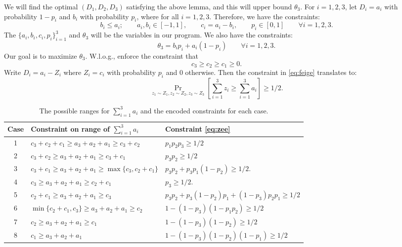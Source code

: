 We will find the optimal $(D_1,D_2, D_3)$ satisfying the above lemma, and this will upper bound $\theta_3$. For $i = 1,2,3$, let $D_i = a_i$ with probability $1-p_i$ and $b_i$ with probability $p_i$, where for all $i = 1,2,3$. Therefore, we have the constraints:
\begin{equation}
\label{eq:3.1}
    b_i \le a_i; \qquad a_i, b_i \in [-1,1],  \qquad  c_i = a_i - b_i, \qquad p_i \in [0,1] \qquad \forall i = 1,2,3. 
\end{equation} 
The $\{a_i,b_i,c_i,p_i\}_{i=1}^3$ and $\theta_3$ will be the variables in our program. We also have the constraints:
\begin{equation} 
\label{eq:3.2}
\theta_3 = b_i p_i + a_i (1-p_i) \qquad \forall i = 1,2,3. 
\end{equation}
Our goal is to maximize $\theta_3$. W.l.o.g., enforce the constraint that 
\begin{equation}
\label{eq:3.3}
c_3 \ge c_2 \ge c_1 \ge 0.
\end{equation}
Write $D_i = a_i - Z_i$ where $Z_i = c_i$ with probability $p_i$ and $0$ otherwise. Then the constraint in \cref{eq:feige} translates to:
\begin{equation}
\label{eq:zee}
\Pr_{z_1  \sim Z_1, z_2 \sim Z_2, z_3 \sim Z_3} \left[ \sum_{i=1}^3 z_i\ge \sum_{i=1}^3 a_i \right] \ge 1/2. 
\end{equation}

\begin{table*}[htbp]
\centering
{}
\begin{tabular}{|c|l|l|}
\hline 
Case &  Constraint on range of $\sum_{i=1}^3 a_i$ & Constraint \cref{eq:zee} \\
\hline 
1 & $ c_3 + c_2 + c_1 \ge a_3 + a_2 + a_1 \ge c_3 + c_2$ & $ p_1 p_2 p_3 \ge 1/2$ \\
2 &  $ c_3 + c_2  \ge a_3 + a_2 + a_1 \ge c_3 + c_1$ & $p_3 p_2 \ge 1/2$ \\
3 & $ c_3 + c_1  \ge a_3 + a_2 + a_1 \ge \max\{c_3, c_2 + c_1\}$  & $p_3 p_2 + p_3 p_1 (1-p_2) \ge 1/2.$ \\
4 &  $c_3   \ge a_3 + a_2 + a_1 \ge c_2 + c_1$ & $ p_3  \ge 1/2.$ \\
5 &  $ c_2+c_1   \ge a_3 + a_2 + a_1 \ge c_3 $ & $p_3  p_2   + p_3  (1-p_2)  p_1 + (1-p_3)  p_2 p_1 \ge 1/2$ \\
6 & $ \min\{c_2+c_1,c_3\}   \ge a_3 + a_2 + a_1 \ge c_2 $ & $ 1 - (1-p_3)  (1 - p_1 p_2) \ge 1/2$ \\
7 & $ c_2   \ge a_3 + a_2 + a_1 \ge c_1 $ & $ 1 - (1-p_3)  (1-p_2) \ge 1/2$ \\
8 &  $c_1 \ge a_3 + a_2 + a_1 $ & $ 1 - (1-p_3)  (1-p_2) (1-p_1) \ge 1/2$ \\
\hline
\end{tabular}
\caption{\label{tab:cases} The possible ranges for $\sum_{i=1}^3 a_i$ and the encoded constraints for each case.}
\end{table*}

